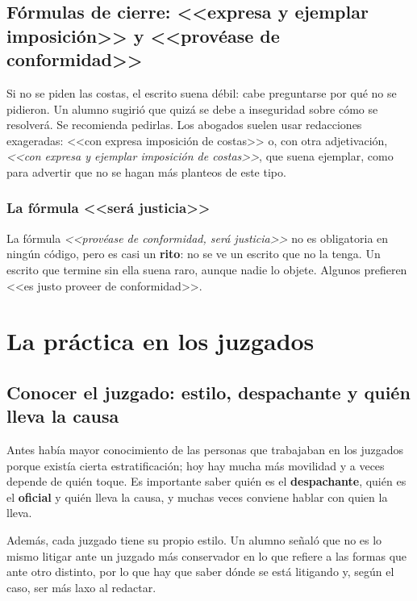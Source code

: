 \documentclass[12pt,oneside]{book}
\begin{document}
\section{Fórmulas de cierre: <<expresa y ejemplar imposición>> y <<provéase de conformidad>>}

Si no se piden las costas, el escrito suena débil: cabe preguntarse por qué no se pidieron. Un alumno sugirió que quizá se debe a inseguridad sobre cómo se resolverá. Se recomienda pedirlas. Los abogados suelen usar redacciones exageradas: <<con expresa imposición de costas>> o, con otra adjetivación, \textit{<<con expresa y ejemplar imposición de costas>>}, que suena ejemplar, como para advertir que no se hagan más planteos de este tipo.

\subsection{La fórmula <<será justicia>>}

La fórmula \textit{<<provéase de conformidad, será justicia>>} no es obligatoria en ningún código, pero es casi un \textbf{rito}: no se ve un escrito que no la tenga. Un escrito que termine sin ella suena raro, aunque nadie lo objete. Algunos prefieren <<es justo proveer de conformidad>>.

\chapter{La práctica en los juzgados}

\section{Conocer el juzgado: estilo, despachante y quién lleva la causa}

Antes había mayor conocimiento de las personas que trabajaban en los juzgados porque existía cierta estratificación; hoy hay mucha más movilidad y a veces depende de quién toque. Es importante saber quién es el \textbf{despachante}, quién es el \textbf{oficial} y quién lleva la causa, y muchas veces conviene hablar con quien la lleva.

Además, cada juzgado tiene su propio estilo. Un alumno señaló que no es lo mismo litigar ante un juzgado más conservador en lo que refiere a las formas que ante otro distinto, por lo que hay que saber dónde se está litigando y, según el caso, ser más laxo al redactar.
\end{document}
